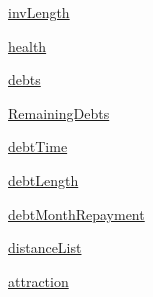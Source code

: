 \begin{DoxyCompactItemize}
\hyperlink{classagents_1_1agents_a3623dd5bd67c4229ef6049c4592147d3}{inv\-Length}
\item 
\hyperlink{classagents_1_1agents_a2e5ba670d92bef6bc5d5ea4904a9899a}{health}
\item 
\hyperlink{classagents_1_1agents_a8af5b98fb6c2ca8ce802290c052b4392}{debts}
\item 
\hyperlink{classagents_1_1agents_a2a9a014bb7422108c9a7eb504069e994}{Remaining\-Debts}
\item 
\hyperlink{classagents_1_1agents_acd8c6c279da34f24cf0a4ac57fcc668a}{debt\-Time}
\item 
\hyperlink{classagents_1_1agents_a114129f82ed141bd1850e108be4619f7}{debt\-Length}
\item 
\hyperlink{classagents_1_1agents_ae652fd2b871b23f82ae04f9ea411bac3}{debt\-Month\-Repayment}
\item 
\hyperlink{classagents_1_1agents_a2a8694885433cdabbf566360dad3e978}{distance\-List}
\item 
\hyperlink{classagents_1_1agents_a295f22a30ae7e7d97b4ad4fe6091601b}{attraction}
\end{DoxyCompactItemize}


